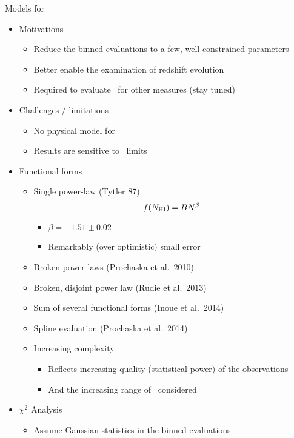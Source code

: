 \documentclass[12pt,letterpaper]{article}
\begin{document}
\begin{Aenumerate}
{\bf \item Models for \fnhi}
	\begin{itemize}
	\item Motivations
		\begin{itemize}
		\item Reduce the binned evaluations to a few, well-constrained parameters
		\item Better enable the examination of redshift evolution
		\item Required to evaluate \fnhi\ for other measures (stay tuned)
		\end{itemize}
	\item Challenges / limitations
		\begin{itemize}
		\item No physical model for \fnhi
		\item Results are sensitive to \nhi\ limits
		\end{itemize}
	\item Functional forms
		\begin{itemize}
		\item Single power-law (Tytler 87)
		\begin{equation}
		f(N_{\rm HI}) = B N^\beta
		\end{equation}
			\begin{itemize}
			\item $\beta = -1.51 \pm 0.02$
			\item Remarkably (over optimistic) small error
			\end{itemize}
		\item Broken power-laws (Prochaska et al.\ 2010)
		\item Broken, disjoint power law (Rudie et al.\ 2013)
		\item Sum of several functional forms (Inoue et al.\ 2014)
		\item Spline evaluation (Prochaska et al.\ 2014)
		\item Increasing complexity 
			\begin{itemize}
			\item Reflects increasing quality (statistical power) of the observations
			\item And the increasing range of \nhi\ considered
			\end{itemize}
		\end{itemize}
	\item $\chi^2$ Analysis
		\begin{itemize}
		\item Assume Gaussian statistics in the binned evaluations

\end{itemize}
\end{itemize}
\end{Aenumerate}
\end{document}
